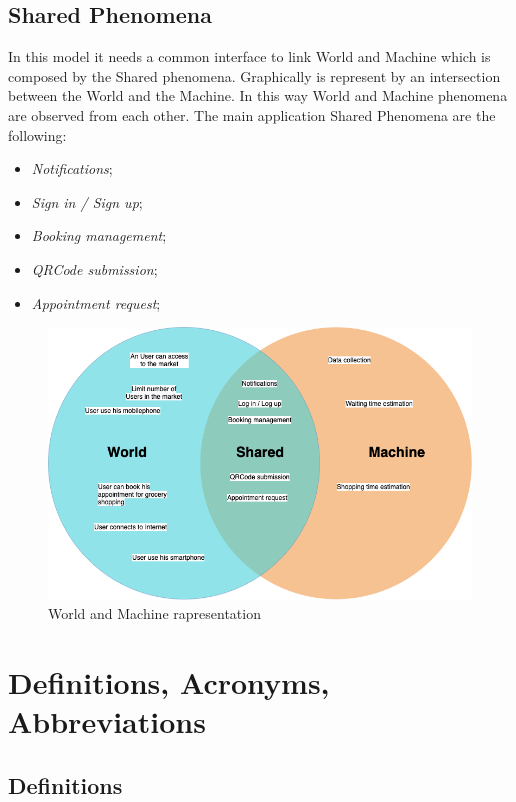 \subsection{Shared Phenomena} 
In this model it needs a common interface to link World and Machine which is composed by the Shared phenomena. Graphically is represent by an intersection between the World and the Machine. In this way World and Machine phenomena are observed from each other.  
The main application Shared Phenomena are the following:

\begin{itemize}
\item \textit{Notifications};
\item \textit{Sign in / Sign up};
\item \textit{Booking management};
\item \textit{QRCode submission};
\item \textit{Appointment request};
\end{itemize}

\begin{figure}[H]
  \caption{World and Machine rapresentation}
  \label{fig:Reservation}
  \centering
  \includegraphics[scale = 0.38]{diagrams/VENN.png}
\end{figure}


\section{Definitions, Acronyms, Abbreviations}
\subsection{Definitions}

